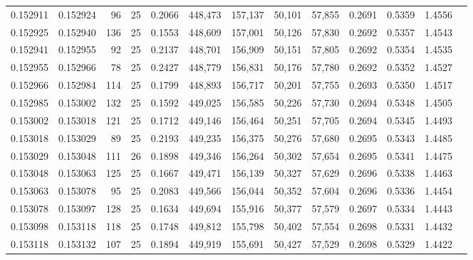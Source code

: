\begin{tabular}{rrrrrrrrrrrrr}
0.152911 & 0.152924 &    96 &  25 &                                     0.2066 & 448,473 & 157,137 &  50,101 &  57,855 & 0.2691 & 0.5359 & 1.4556 \\
0.152925 & 0.152940 &   136 &  25 &                                     0.1553 & 448,609 & 157,001 &  50,126 &  57,830 & 0.2692 & 0.5357 & 1.4543 \\
0.152941 & 0.152955 &    92 &  25 &                                     0.2137 & 448,701 & 156,909 &  50,151 &  57,805 & 0.2692 & 0.5354 & 1.4535 \\
0.152955 & 0.152966 &    78 &  25 &                                     0.2427 & 448,779 & 156,831 &  50,176 &  57,780 & 0.2692 & 0.5352 & 1.4527 \\
0.152966 & 0.152984 &   114 &  25 &                                     0.1799 & 448,893 & 156,717 &  50,201 &  57,755 & 0.2693 & 0.5350 & 1.4517 \\
0.152985 & 0.153002 &   132 &  25 &                                     0.1592 & 449,025 & 156,585 &  50,226 &  57,730 & 0.2694 & 0.5348 & 1.4505 \\
0.153002 & 0.153018 &   121 &  25 &                                     0.1712 & 449,146 & 156,464 &  50,251 &  57,705 & 0.2694 & 0.5345 & 1.4493 \\
0.153018 & 0.153029 &    89 &  25 &                                     0.2193 & 449,235 & 156,375 &  50,276 &  57,680 & 0.2695 & 0.5343 & 1.4485 \\
0.153029 & 0.153048 &   111 &  26 &                                     0.1898 & 449,346 & 156,264 &  50,302 &  57,654 & 0.2695 & 0.5341 & 1.4475 \\
0.153048 & 0.153063 &   125 &  25 &                                     0.1667 & 449,471 & 156,139 &  50,327 &  57,629 & 0.2696 & 0.5338 & 1.4463 \\
0.153063 & 0.153078 &    95 &  25 &                                     0.2083 & 449,566 & 156,044 &  50,352 &  57,604 & 0.2696 & 0.5336 & 1.4454 \\
0.153078 & 0.153097 &   128 &  25 &                                     0.1634 & 449,694 & 155,916 &  50,377 &  57,579 & 0.2697 & 0.5334 & 1.4443 \\
0.153098 & 0.153118 &   118 &  25 &                                     0.1748 & 449,812 & 155,798 &  50,402 &  57,554 & 0.2698 & 0.5331 & 1.4432 \\
0.153118 & 0.153132 &   107 &  25 &                                     0.1894 & 449,919 & 155,691 &  50,427 &  57,529 & 0.2698 & 0.5329 & 1.4422 \\

\end{tabular}
